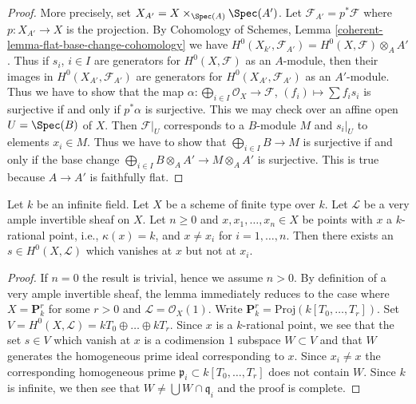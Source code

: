 \begin{proof}
More precisely, set $X_{A'} = X \times_{\Spec(A)} \Spec(A')$.
Let $\mathcal{F}_{A'} = p^*\mathcal{F}$ where $p : X_{A'} \to X$
is the projection. By
Cohomology of Schemes, Lemma \ref{coherent-lemma-flat-base-change-cohomology}
we have
$H^0(X_{k'}, \mathcal{F}_{A'}) = H^0(X, \mathcal{F}) \otimes_A A'$.
Thus if $s_i$, $i \in I$ are generators for $H^0(X, \mathcal{F})$
as an $A$-module, then their images in $H^0(X_{A'}, \mathcal{F}_{A'})$
are generators for $H^0(X_{A'}, \mathcal{F}_{A'})$ as an $A'$-module.
Thus we have to show that the map
$\alpha : \bigoplus_{i \in I} \mathcal{O}_X \to \mathcal{F}$,
$(f_i) \mapsto \sum f_i s_i$
is surjective if and only if $p^*\alpha$ is surjective.
This we may check over an affine open $U = \Spec(B)$ of $X$.
Then $\mathcal{F}|_U$ corresponds to a $B$-module $M$
and $s_i|_U$ to elements $x_i \in M$. Thus we have to show
that $\bigoplus_{i \in I} B \to M$ is surjective if and only
if the base change $\bigoplus_{i \in I} B \otimes_A A' \to M \otimes_A A'$
is surjective. This is true because $A \to A'$ is faithfully flat.
\end{proof}

\begin{lemma}
\label{lemma-very-ample-vanish-at-point}
Let $k$ be an infinite field. Let $X$ be a scheme of finite type over $k$.
Let $\mathcal{L}$ be a very ample invertible sheaf on $X$.
Let $n \geq 0$ and $x, x_1, \ldots, x_n \in X$ be points with
$x$ a $k$-rational point, i.e., $\kappa(x) = k$, and
$x \not = x_i$ for $i = 1, \ldots, n$.
Then there exists an $s \in H^0(X, \mathcal{L})$ which vanishes at
$x$ but not at $x_i$.
\end{lemma}

\begin{proof}
If $n = 0$ the result is trivial, hence we assume $n > 0$.
By definition of a very ample invertible sheaf, the lemma immediately
reduces to the case where $X = \mathbf{P}^r_k$ for some $r > 0$
and $\mathcal{L} = \mathcal{O}_X(1)$. Write
$\mathbf{P}^r_k = \text{Proj}(k[T_0, \ldots, T_r])$.
Set $V = H^0(X, \mathcal{L}) = kT_0 \oplus \ldots \oplus kT_r$.
Since $x$ is a $k$-rational point, we see that the set
$s \in V$ which vanish at $x$ is a codimension $1$ subspace
$W \subset V$ and that $W$ generates the homogeneous prime
ideal corresponding to $x$. Since $x_i \not = x$ the corresponding
homogeneous prime $\mathfrak p_i \subset k[T_0, \ldots, T_r]$ does
not contain $W$. Since $k$ is infinite, we then see that
$W \not = \bigcup W \cap \mathfrak q_i$ and the proof is complete.
\end{proof}

